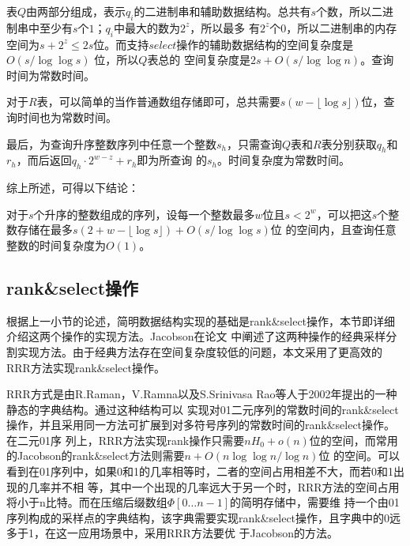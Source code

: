 表$Q$由两部分组成，表示$q_i$的二进制串和辅助数据结构。总共有$s$个数，所以二进制串中至少有$s$个$1$；$q_i$中最大的数为$2^z$，所以最多
有$2^z$个$0$，所以二进制串的内存空间为$s+2^z \leq 2s$位。而支持$select$操作的辅助数据结构的空间复杂度是$O(s/\log \log s)$ 位，所以$Q$表总的
空间复杂度是$2s+O(s/\log \log n)$。查询时间为常数时间。

对于$R$表，可以简单的当作普通数组存储即可，总共需要$s(w-\lfloor \log s \rfloor)$位，查询时间也为常数时间。

最后，为查询升序整数序列中任意一个整数$s_h$，只需查询$Q$表和$R$表分别获取$q_h$和$r_h$，而后返回$q_h \cdot 2^{w-z}+r_h$即为所查询
的$s_h$。时间复杂度为常数时间。

综上所述，可得以下结论：
\begin{cor}\label{cor2}
对于$s$个升序的整数组成的序列，设每一个整数最多$w$位且$s<2^w$，可以把这$s$个整数存储在最多$s(2+w-\lfloor \log s \rfloor)+O(s/\log \log s)$位
的空间内，且查询任意整数的时间复杂度为$O(1)$。
\end{cor}

\subsection{rank\&select操作}

根据上一小节的论述，简明数据结构实现的基础是rank\&select操作，本节即详细介绍这两个操作的实现方法。Jacobson在论文\cite{jacobson1989space}
中阐述了这两种操作的经典采样分割实现方法。由于经典方法存在空间复杂度较低的问题，本文采用了更高效的RRR方法实现rank\&select操作。

RRR方式是由R.Raman，V.Ramna以及S.Srinivasa Rao等人于2002年提出的一种静态的字典结构\cite{raman2002succinct}。通过这种结构可以
实现对01二元序列的常数时间的rank\&select操作，并且采用同一方法可扩展到对多符号序列的常数时间的rank\&select操作。在二元01序
列上，RRR方法实现rank操作只需要$nH_0 + o(n)$位的空间，而常用的Jacobson的rank\&select方法则需要$n + O(n\log\log n/\log n)$位
的空间\cite{jacobson1989space}。可以看到在01序列中，如果0和1的几率相等时，二者的空间占用相差不大，而若0和1出现的几率并不相
等，其中一个出现的几率远大于另一个时，RRR方法的空间占用将小于n比特。而在压缩后缀数组$\Phi[0\ldots n-1]$的简明存储中，需要维
持一个由01序列构成的采样点的字典结构，该字典需要实现rank\&select操作，且字典中的0远多于1，在这一应用场景中，采用RRR方法要优
于Jacobson的方法。

